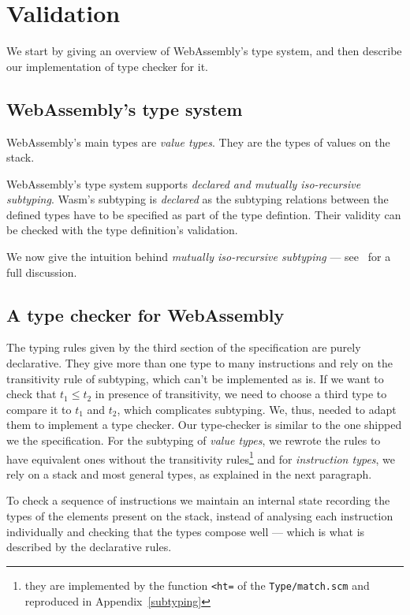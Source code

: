 \documentclass[a4paper,11pt]{article}
\begin{document}
\section{Validation}\label{val}
We start by giving an overview of WebAssembly's type system, and then describe
our implementation of type checker for it.
\subsection{WebAssembly's type system}
WebAssembly's main types are \emph{value types}. They are the types of values on
the stack.

WebAssembly's type system supports \emph{declared and mutually iso-recursive
subtyping}.
Wasm's subtyping is \emph{declared} as the subtyping relations between the
defined types have to be specified as part of the type defintion. Their validity
can be checked with the type definition's validation.

We now give the intuition behind \emph{mutually iso-recursive subtyping} ---
see~\cite{rossberg2023mutually} for a full discussion.

\subsection{A type checker for WebAssembly}
The typing rules given by the third section of the specification are purely
declarative. They give more than one type to many instructions and rely on the
transitivity rule of subtyping, which can't be implemented as is. If we want to
check that $t_1 \leq t_2$ in presence of transitivity, we need to choose a third
type to compare it to $t_1$ and $t_2$, which complicates subtyping. We, thus,
needed to adapt them to implement a type checker. Our type-checker is similar to
the one shipped we the specification. For the subtyping of \emph{value types},
we rewrote the rules to have equivalent ones without the transitivity
rules\footnote{they are implemented by the function \texttt{<ht=} of the
\texttt{Type/match.scm} and reproduced in Appendix~\ref{subtyping}} and for
\emph{instruction types}, we rely on a stack and most general types, as
explained in the next paragraph.

To check a sequence of instructions we maintain an internal state recording the
types of the elements present on the stack, instead of analysing each
instruction individually and checking that the types compose well --- which is
what is described by the declarative rules.
\end{document}
